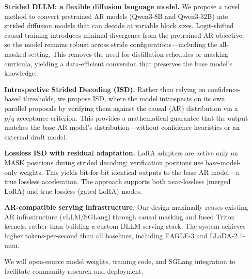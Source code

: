 \begin{denseitemize}
    \item \textbf{Strided DLLM: a flexible diffusion language model.} We propose a novel method to convert pretrained AR models (Qwen3-8B and Qwen3-32B) into strided diffusion models that can decode at variable block sizes. Logit-shifted causal training introduces minimal divergence from the pretrained AR objective, so the model remains robust across stride configurations---including the all-masked setting. This removes the need for distillation schedules or masking curricula, yielding a data-efficient conversion that preserves the base model's knowledge.

    \item \textbf{Introspective Strided Decoding (ISD).} Rather than relying on confidence-based thresholds, we propose ISD, where the model introspects on its own parallel proposals by verifying them against the causal (AR) distribution via a $p/q$ acceptance criterion. This provides a mathematical guarantee that the output matches the base AR model's distribution---without confidence heuristics or an external draft model.

    \item \textbf{Lossless ISD with residual adaptation.} LoRA adapters are active only on MASK positions during strided decoding; verification positions use base-model-only weights. This yields bit-for-bit identical outputs to the base AR model---a true lossless acceleration. The approach supports both near-lossless (merged LoRA) and true lossless (gated LoRA) modes.

    \item \textbf{AR-compatible serving infrastructure.} Our design maximally reuses existing AR infrastructure (vLLM/SGLang) through causal masking and fused Triton kernels, rather than building a custom DLLM serving stack. The system achieves higher tokens-per-second than all baselines, including EAGLE-3 and LLaDA-2.1-mini.
\end{denseitemize}

We will open-source model weights, training code, and SGLang integration to facilitate community research and deployment.